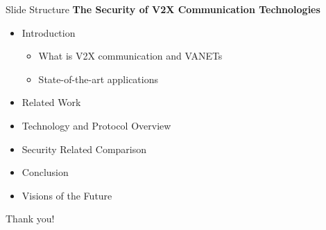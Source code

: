 \documentclass[]{beamer} %
\begin{document}
\begin{frame}{Slide Structure}
	\textbf{The Security of V2X Communication Technologies}

	\begin{itemize}
		\item Introduction
			\begin{itemize}
				\item What is V2X communication and VANETs
				\item State-of-the-art applications
			\end{itemize}
		\item Related Work
		\item Technology and Protocol Overview
		\item Security Related Comparison
		\item Conclusion
		\item Visions of the Future
	\end{itemize}
\end{frame}

\begin{titleframe}
	\begin{center}
	\alert{\Large Thank you!}
	\end{center}
\end{titleframe}
\end{document}
